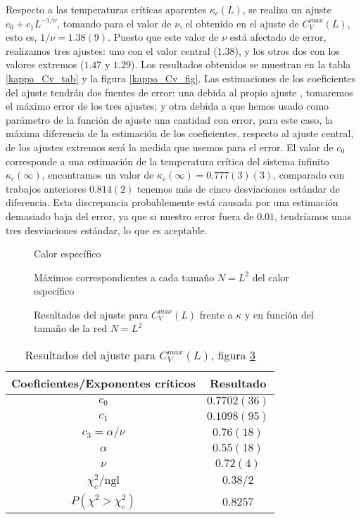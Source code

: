 Respecto a las temperaturas críticas aparentes $\kappa_c(L)$, se realiza un
ajuste $c_0+c_1L^{-1/\nu}$, tomando para el valor de $\nu$, el obtenido en el
ajuste de $C_V^{max}(L)$, esto es, $1/\nu=1.38(9)$. Puesto que este valor de
$\nu$ está afectado de error, realizamos tres ajustes: uno con el valor
central ($1.38$), y los otros dos con los valores extremos ($1.47$ y
$1.29$). Los resultados obtenidos se muestran en la tabla \ref{kappa_Cv_tab} y
la figura \ref{kappa_Cv_fig}. Las estimaciones de los coeficientes del ajuste
tendrán dos fuentes de error: una debida al propio ajuste  
, tomaremos el máximo error de los tres ajustes; y otra debida a que hemos
usado como parámetro de la función de ajuste una cantidad con error, para este caso, la
máxima diferencia de la estimación de los coeficientes, respecto al ajuste central, de los
ajustes extremos será la medida que usemos para el error. El valor
de $c_0$ corresponde a una estimación de la temperatura crítica del sistema
infinito $\kappa_c(\infty)$, encontramos un valor de
$\kappa_c(\infty)=0.777(3)(3)$, comparado con trabajos anteriores $0.814(2)$
\cite{Wheater_Critical_exponents} tenemos más de cinco desviaciones estándar
de diferencia. Esta discrepancia probablemente está causada por una
estimación demasiado baja del error, ya que si nuestro error fuera de $0.01$, tendríamos unas 
tres desviaciones estándar, lo que es aceptable.

\begin{figure}[h]
  \centering
  
  \caption{Calor específico}\label{Cv_fig}
\end{figure}

\begin{figure}[h]
  \centering
  
  \caption{Máximos correspondientes a cada tamaño $N=L^2$ del calor específico}\label{max_Cv_fig}
\end{figure}
\clearpage
\begin{figure}[h]
  \centering
  
  \caption{Resultados del ajuste para $C_V^{max}(L)$ frente a $\kappa$ y en
    función del tamaño de la red $N=L^2$}\label{max_Cv_L_fig}
\end{figure}

\begin{table}[h]
\centering
\begin{tabular}{|c|c|}\hline
 Coeficientes/Exponentes críticos & Resultado \\\hline
 $c_0$         & $0.7702(36) $ \\ \hline
 $c_1$         & $0.1098(95)$ \\ \hline
 $c_3=\alpha/\nu$  & $0.76(18)$  \\ \hline
$\alpha$      & $0.55(18)$ \\ \hline
$\nu $        & $0.72(4)$ \\ \hline
$\chi_c^2/\mathrm{ngl}$ &  $0.38/2$   \\ \hline
 $P(\chi^2>\chi_c^2)$&  $0.8257$\\ \hline
\end{tabular}
\caption{Resultados del ajuste para $C_V^{max}(L)$, figura \ref{max_Cv_L_fig}}\label{max_Cv_L_tab}
\end{table}

